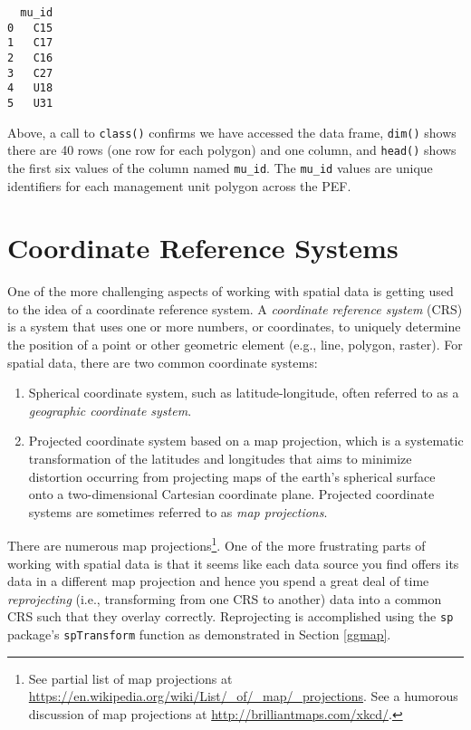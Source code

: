 \documentclass[]{krantz}
\providecommand{\tightlist}{%
  \setlength{\itemsep}{0pt}\setlength{\parskip}{0pt}}
\theoremstyle{definition}
\theoremstyle{definition}
\theoremstyle{definition}
\theoremstyle{remark}
\begin{document}
\begin{verbatim}
  mu_id
0   C15
1   C17
2   C16
3   C27
4   U18
5   U31
\end{verbatim}

Above, a call to \texttt{class()} confirms we have accessed the data
frame, \texttt{dim()} shows there are 40 rows (one row for each polygon)
and one column, and \texttt{head()} shows the first six values of the
column named \texttt{mu\_id}. The \texttt{mu\_id} values are unique
identifiers for each management unit polygon across the PEF.

\section{Coordinate Reference
Systems}\label{coordinate-reference-systems}

One of the more challenging aspects of working with spatial data is
getting used to the idea of a coordinate reference system. A
\emph{coordinate reference system} (CRS) is a system that uses one or
more numbers, or coordinates, to uniquely determine the position of a
point or other geometric element (e.g., line, polygon, raster). For
spatial data, there are two common coordinate systems:

\begin{enumerate}
\def\labelenumi{\arabic{enumi}.}
\tightlist
\item
  Spherical coordinate system, such as latitude-longitude, often
  referred to as a \emph{geographic coordinate system}.
\item
  Projected coordinate system based on a map projection, which is a
  systematic transformation of the latitudes and longitudes that aims to
  minimize distortion occurring from projecting maps of the earth's
  spherical surface onto a two-dimensional Cartesian coordinate plane.
  Projected coordinate systems are sometimes referred to as \emph{map
  projections}.
\end{enumerate}

There are numerous map projections\footnote{See partial list of map
  projections at
  \url{https://en.wikipedia.org/wiki/List/_of/_map/_projections}. See a
  humorous discussion of map projections at
  \url{http://brilliantmaps.com/xkcd/}.}. One of the more frustrating
parts of working with spatial data is that it seems like each data
source you find offers its data in a different map projection and hence
you spend a great deal of time \emph{reprojecting} (i.e., transforming
from one CRS to another) data into a common CRS such that they overlay
correctly. Reprojecting is accomplished using the \texttt{sp} package's
\texttt{spTransform} function as demonstrated in Section \ref{ggmap}.
\end{document}
